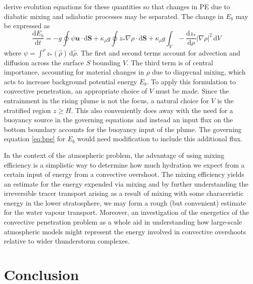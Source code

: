 \documentclass[a4paper]{article}
\begin{document}
\citet{winters1995} derive evolution equations for these quantities so that changes in PE due to diabatic
mixing and adiabatic processes may be separated. The change in $E_b$ may be expressed as
\begin{equation}
	\frac{\mathrm{d} E_b}{\mathrm{d}t} = -g\oint \psi \bm{u}\cdot \mathrm{d}\bm{S} + \kappa_\rho g \oint z_*
	\nabla \rho \cdot \mathrm{d}\bm{S} + \kappa_\rho g \int_V -\frac{\mathrm{d}z_*}{\mathrm{d}\rho} \left|
	\nabla \rho \right|^2 \,\mathrm{d}V \label{eq:bpe}
\end{equation}
where $\psi = \int^\rho z_*(\hat{\rho}) \, \mathrm{d}\hat{\rho}$. The first and second terms account for
advection and diffusion across the surface $S$ bounding $V$. The third term is of central importance,
accounting for material changes in $\rho$ due to diapycnal mixing, which acts to increase background potential
energy $E_b$. To apply this formulation to convective penetration, an appropriate choice of $V$ must be made.
Since the entrainment in the rising plume is not the focus, a natural choice for $V$ is the stratified region
$z \geq H$. This also conveniently does away with the need for a buoyancy source in the governing equations
and instead an input flux on the bottom boundary accounts for the buoyancy input of the plume. The governing
equation \eqref{eq:bpe} for $E_b$ would need modification to include this additional flux.

In the context of the atmospheric problem, the advantage of using mixing efficiency is a simplistic way to
determine how much hydration we expect from a certain input of energy from a convective overshoot. The mixing
efficiency yields an estimate for the energy expended via mixing and by further understanding the irreversible
tracer transport arising as a result of mixing with some characeristic energy in the lower stratosphere, we
may form a rough (but convenient) estimate for the water vapour transport. Moreover, an investigation of the
energetics of the convective penetration problem as a whole aid in understanding how large-scale atmospheric
models might represent the energy involved in convective overshoots relative to wider thunderstorm complexes.

\section{Conclusion}
	
\end{document}
